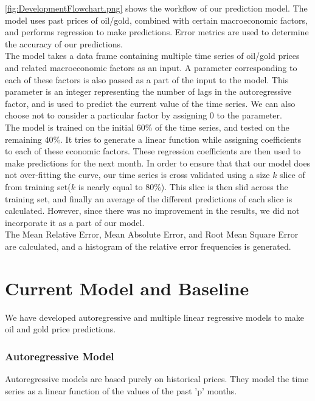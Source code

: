 \documentclass[runningheads]{llncs}
\begin{document}
\noindent \autoref{fig:DevelopmentFlowchart.png} shows the workflow of our prediction model. The model uses past prices of oil/gold, combined with certain macroeconomic factors, and performs regression to make predictions. Error metrics are used to determine the accuracy of our predictions.\\

\noindent The model takes a data frame containing multiple time series of oil/gold prices and related macroeconomic factors as an input. A parameter corresponding to each of these factors is also passed as a part of the input to the model. This parameter is an integer representing the number of lags in the autoregressive factor, and is used to predict the current value of the time series. We can also choose not to consider a particular factor by assigning $0$ to the parameter.\\

\noindent The model is trained on the initial 60\% of the time series, and tested on the remaining 40\%. It tries to generate a linear function while assigning coefficients to each of these economic factors. These regression coefficients are then used to make predictions for the next month. In order to ensure that that our model does not over-fitting the curve, our time series is cross validated using a size $k$ slice of from training set($k$ is nearly equal to 80\%). This slice is then slid across the training set, and finally an average of the different predictions of each slice is calculated. However, since there was no improvement in the results, we did not incorporate it as a part of our model.\\

The Mean Relative Error, Mean Absolute Error, and Root Mean Square Error are calculated, and a histogram of the relative error frequencies is generated. \\

\newpage
\section{Current Model and Baseline}

We have developed autoregressive and multiple linear regressive models to make oil and gold price predictions.

\subsubsection{Autoregressive Model}
Autoregressive models are based purely on historical prices. They model the time series as a linear function of the values of the past 'p' months.\\
\end{document}
